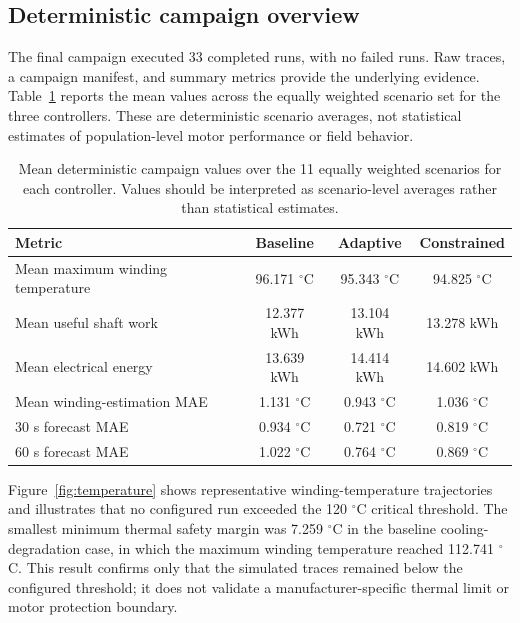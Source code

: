 \documentclass[machines,article,submit,moreauthors]{Definitions/mdpi}
\begin{document}
\subsection{Deterministic campaign overview}

The final campaign executed 33 completed runs, with no failed runs. Raw traces, a campaign manifest, and summary metrics provide the underlying evidence. Table~\ref{tab:campaign} reports the mean values across the equally weighted scenario set for the three controllers. These are deterministic scenario averages, not statistical estimates of population-level motor performance or field behavior.

\begin{table}[H]
\caption{Mean deterministic campaign values over the 11 equally weighted scenarios for each controller. Values should be interpreted as scenario-level averages rather than statistical estimates.\label{tab:campaign}}
\begin{tabularx}{\textwidth}{l c c c}
\toprule
\textbf{Metric} & \textbf{Baseline} & \textbf{Adaptive} & \textbf{Constrained} \\
\midrule
Mean maximum winding temperature & 96.171 $^{\circ}$C & 95.343 $^{\circ}$C & 94.825 $^{\circ}$C \\
Mean useful shaft work & 12.377 kWh & 13.104 kWh & 13.278 kWh \\
Mean electrical energy & 13.639 kWh & 14.414 kWh & 14.602 kWh \\
Mean winding-estimation MAE & 1.131 $^{\circ}$C & 0.943 $^{\circ}$C & 1.036 $^{\circ}$C \\
30 s forecast MAE & 0.934 $^{\circ}$C & 0.721 $^{\circ}$C & 0.819 $^{\circ}$C \\
60 s forecast MAE & 1.022 $^{\circ}$C & 0.764 $^{\circ}$C & 0.869 $^{\circ}$C \\
\bottomrule
\end{tabularx}
\end{table}

Figure~\ref{fig:temperature} shows representative winding-temperature trajectories and illustrates that no configured run exceeded the 120 $^{\circ}$C critical threshold. The smallest minimum thermal safety margin was 7.259 $^{\circ}$C in the baseline cooling-degradation case, in which the maximum winding temperature reached 112.741 $^{\circ}$C. This result confirms only that the simulated traces remained below the configured threshold; it does not validate a manufacturer-specific thermal limit or motor protection boundary.
\end{document}
